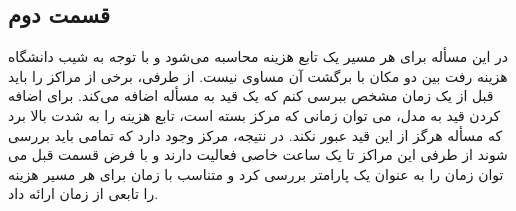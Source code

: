 \subsection{قسمت دوم}
در این مسأله برای هر مسیر یک تابع هزینه محاسبه می‌شود و با توجه به شیب دانشگاه هزینه رفت بین دو مکان با برگشت آن مساوی نیست. از طرفی، برخی از مراکز را باید قبل از یک زمان مشخص ببرسی کنم که یک قید به مسأله اضافه می‌کند. برای اضافه کردن قید به مدل، می توان زمانی که مرکز بسته است، تابع هزینه را به شدت بالا برد که مسأله هرگز از این قید عبور نکند. در نتیجه،  مرکز وجود دارد که تمامی باید بررسی شوند از طرفی این مراکز تا یک ساعت خاصی فعالیت دارند و با فرض قسمت قبل می توان زمان را به عنوان یک پارامتر بررسی کرد و متناسب با زمان برای هر مسیر هزینه را تابعی از زمان ارائه داد.